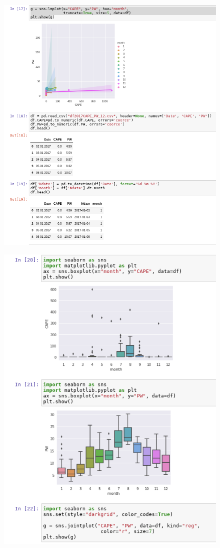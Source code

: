 \documentclass{article}
\begin{document}
\begin{figure}[H]
	\centering
    \includegraphics[width=\linewidth]{p3.png}
\end{figure}
\begin{figure}[H]
	\centering
    \includegraphics[width=\linewidth]{p4.png}
\end{figure}
\end{document}
